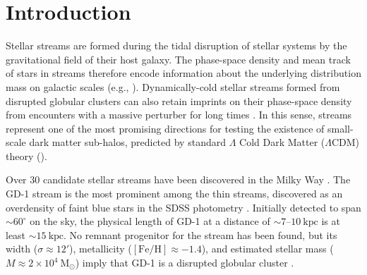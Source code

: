 \documentclass[modern]{aastex62}
\newcommand{\msun}{\textrm{M}_\odot}
\newcommand{\kpc}{\textrm{kpc}}
\newcommand{\feh}{\ensuremath{[\textrm{Fe} / \textrm{H}]}}
\begin{document}

\section{Introduction}
\label{sec:intro}

Stellar streams are formed during the tidal disruption of stellar systems by the
gravitational field of their host galaxy.
The phase-space density and mean track of stars in streams therefore encode
information about the underlying distribution mass on galactic
scales (e.g., \citealt{Johnston:1999, Bonaca:2018}).
Dynamically-cold stellar streams formed from disrupted globular clusters can
also retain imprints on their phase-space density from encounters with a massive
perturber for long times \citep[e.g.,][]{Yoon:2011}.
In this sense, streams represent one of the most promising directions for
testing the existence of small-scale dark matter sub-halos, predicted by
standard $\Lambda$ Cold Dark Matter ($\Lambda$CDM) theory
(\citealt{Erkal:2015, Sanders:2016, Bovy:2017}).

Over 30 candidate stellar streams have been discovered in the Milky Way \citep{Grillmair:2016, Newberg:2016, Malhan:2018}.
The GD-1 stream is the most prominent among the thin streams, discovered as an
overdensity of faint blue stars in the SDSS photometry \citep{Grillmair:2006}.
Initially detected to span $\sim 60^\circ$ on the sky, the physical length of GD-1 at a distance of $\sim
7$--$10~\textrm{kpc}$ is at least $\sim 15~\kpc$.
No remnant progenitor for the stream has been found, but its width ($\sigma
\approx 12'$), metallicity ($\feh \approx -1.4$), and estimated stellar mass ($M
\approx 2 \times 10^4~\msun$) imply that GD-1 is a disrupted globular cluster
\citep{Koposov:2010}.
\end{document}
